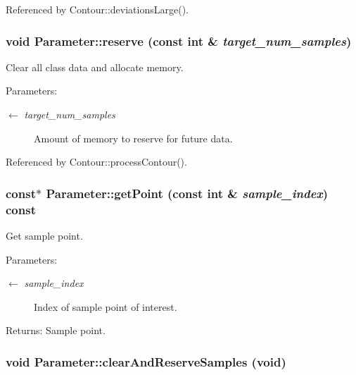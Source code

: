 Referenced by Contour::deviationsLarge().\hypertarget{classParameter_8db6db4bd306208ccfbf94ef04d39955}{
\subsubsection[reserve]{\setlength{\rightskip}{0pt plus 5cm}void Parameter::reserve (const int \& {\em target\_\-num\_\-samples})}}
\label{classParameter_8db6db4bd306208ccfbf94ef04d39955}


Clear all class data and allocate memory. \begin{Desc}
\item[Parameters:]
\begin{description}
\item[\mbox{$\leftarrow$} {\em target\_\-num\_\-samples}]Amount of memory to reserve for future data. \end{description}
\end{Desc}


Referenced by Contour::processContour().\hypertarget{classParameter_21bfc1fa9f7999cd18429493fef88485}{
\subsubsection[getPoint]{ const$\ast$ Parameter::getPoint (const int \& {\em sample\_\-index}) const}}
\label{classParameter_21bfc1fa9f7999cd18429493fef88485}


Get sample point. \begin{Desc}
\item[Parameters:]
\begin{description}
\item[\mbox{$\leftarrow$} {\em sample\_\-index}]Index of sample point of interest. \end{description}
\end{Desc}
\begin{Desc}
\item[Returns:]Sample point. \end{Desc}
\hypertarget{classParameter_90c14f9388c291ebd0199b542ea3eaa2}{
\subsubsection[clearAndReserveSamples]{\setlength{\rightskip}{0pt plus 5cm}void Parameter::clearAndReserveSamples (void)}}
\label{classParameter_90c14f9388c291ebd0199b542ea3eaa2}



